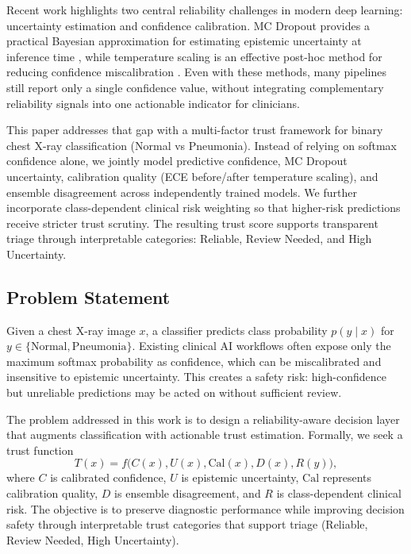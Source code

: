 \documentclass[conference]{IEEEtran}
\begin{document}
Recent work highlights two central reliability challenges in modern deep learning: uncertainty estimation and confidence calibration. MC Dropout provides a practical Bayesian approximation for estimating epistemic uncertainty at inference time \cite{gal2016dropout}, while temperature scaling is an effective post-hoc method for reducing confidence miscalibration \cite{guo2017calibration}. Even with these methods, many pipelines still report only a single confidence value, without integrating complementary reliability signals into one actionable indicator for clinicians.

This paper addresses that gap with a multi-factor trust framework for binary chest X-ray classification (Normal vs Pneumonia). Instead of relying on softmax confidence alone, we jointly model predictive confidence, MC Dropout uncertainty, calibration quality (ECE before/after temperature scaling), and ensemble disagreement across independently trained models. We further incorporate class-dependent clinical risk weighting so that higher-risk predictions receive stricter trust scrutiny. The resulting trust score supports transparent triage through interpretable categories: Reliable, Review Needed, and High Uncertainty.

\subsection{Problem Statement}
Given a chest X-ray image $x$, a classifier predicts class probability $p(y\mid x)$ for $y \in \{\text{Normal},\text{Pneumonia}\}$. Existing clinical AI workflows often expose only the maximum softmax probability as confidence, which can be miscalibrated and insensitive to epistemic uncertainty. This creates a safety risk: high-confidence but unreliable predictions may be acted on without sufficient review.

The problem addressed in this work is to design a reliability-aware decision layer that augments classification with actionable trust estimation. Formally, we seek a trust function
\begin{equation}
T(x) = f\big(C(x), U(x), \mathrm{Cal}(x), D(x), R(y)\big),
\end{equation}
where $C$ is calibrated confidence, $U$ is epistemic uncertainty, $\mathrm{Cal}$ represents calibration quality, $D$ is ensemble disagreement, and $R$ is class-dependent clinical risk. The objective is to preserve diagnostic performance while improving decision safety through interpretable trust categories that support triage (Reliable, Review Needed, High Uncertainty).
\end{document}
